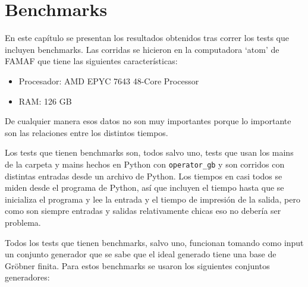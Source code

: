 \documentclass[12pt]{report}
\theoremstyle{customstyle}
\theoremstyle{factstyle}
\begin{document}
\chapter{Benchmarks}\label{cap:Benchmarks}

En este capítulo se presentan los resultados obtenidos tras correr los tests que incluyen benchmarks. Las corridas se hicieron en la computadora `atom' de FAMAF que tiene las siguientes características:

\begin{itemize}
  \item Procesador: AMD EPYC 7643 48-Core Processor
  \item RAM: 126 GB
\end{itemize}

De cualquier manera esos datos no son muy importantes porque lo importante son las relaciones entre los distintos tiempos.

Los tests que tienen benchmarks son, todos salvo uno, tests que usan los mains de la carpeta  y mains hechos en Python con \texttt{operator\_gb} y son corridos con distintas entradas desde un archivo de Python. Los tiempos en casi todos se miden desde el programa de Python, así que incluyen el tiempo hasta que se inicializa el programa y lee la entrada y el tiempo de impresión de la salida, pero como son siempre entradas y salidas relativamente chicas eso no debería ser problema.

Todos los tests que tienen benchmarks, salvo uno, funcionan tomando como input un conjunto generador que se sabe que el ideal generado tiene una base de Gröbner finita. Para estos benchmarks se usaron los siguientes conjuntos generadores:
\end{document}
